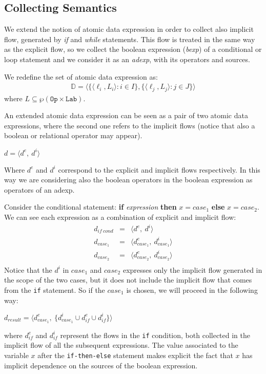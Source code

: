 \documentclass{llncs}
\newcommand{\blangle}{\big\langle}
\newcommand{\brangle}{\big\rangle}
\begin{document}
\subsection{Collecting Semantics}
We extend the notion of atomic data expression in order to collect also implicit flow, generated by \emph{if} and \emph{while} statements. This flow is treated in the same way as the explicit flow, so we collect the boolean expression (\emph{bexp}) of a conditional or loop statement and we consider it as an \emph{adexp}, with its operators and sources.

\begin{definition}\label{ext_conc_ad_exp}
We redefine the set of atomic data expression as:
\begin{align*}
\mathds{D}= \blangle\{\langle \ell_i, L_i\rangle : i \in I\}, \{\langle \ell_j, L_j\rangle : j \in J\} \brangle
\end{align*}
where $L \subseteq \wp(\texttt{Op} \times \texttt{Lab})$.
\end{definition}

An extended atomic data expression can be seen as a pair of two atomic data expressions, where the second one refers to the implicit flows (notice that also a boolean or relational operator may appear). 
\begin{center}
$d = \langle d^e,\ d^i\rangle$
\end{center}
Where $d^e$ and $d^i$ correspond to the explicit and implicit flows respectively. In this way we are considering also the boolean operators in the boolean expression as operators of an adexp. 

Consider the conditional statement:  \textbf{if} \textit{expression} \textbf{then} $x = case_1$ \textbf{else} $x = case_2$.  We can see each expression as a combination of explicit and implicit flow:
\[
\begin{array}{lcl}
d_{if\ cond} & = & \langle d^e ,\ d^i \rangle\\
d_{case_1} & = & \langle d_{case_1}^e ,\ d_{case_1}^i \rangle\\
d_{case_2} & = & \langle d_{case_2}^e ,\ d_{case_2}^i \rangle\\
\end{array}
\]
Notice that the $d^i$ in $case_1$ and $case_2$ expresses only the implicit flow generated in the scope of the two cases, but it does not include the implicit flow that comes from the \texttt{if} statement. So if the $case_1$ is chosen, we will proceed in the following way:
\begin{center}
$d_{result} = \blangle d_{case_1}^e,\ \{d_{case_1}^i \cup d_{if}^e \cup d_{if}^i\}\brangle$
\end{center}
where $d_{if}^e$ and $d_{if}^i$ represent the flows in the \texttt{if} condition, both collected in the implicit flow of all the subsequent expressions. The value associated to the variable $x$ after the \texttt{if-then-else} statement makes explicit the fact that $x$ has implicit dependence on the sources of the boolean expression.\\
\end{document}
